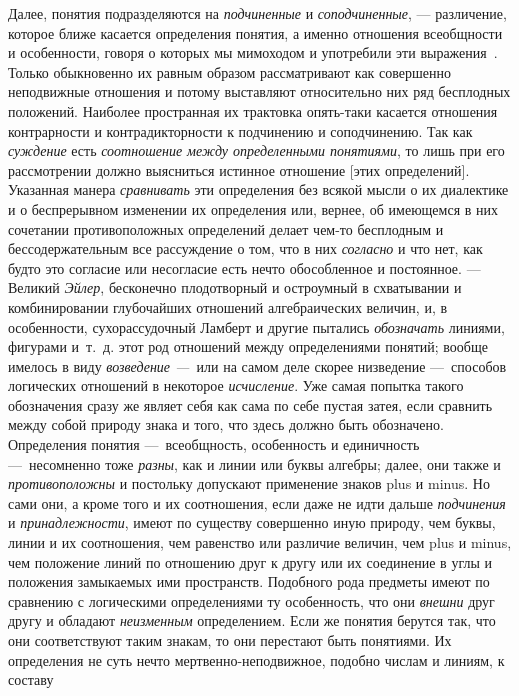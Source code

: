 \documentclass[twoside]{article}
\begin{document}
{{Далее, понятия подразделяются на
{\em подчиненные} и
{\em соподчиненные}, — 
различение, которое ближе касается определения понятия, а
именно отношения всеобщности и особенности, говоря о которых мы мимоходом и
употребили эти
выражения~\label{bkm:bm22}.
Только обыкновенно их равным образом
рассматривают как совершенно неподвижные отношения и потому выставляют
относительно них ряд бесплодных положений. Наиболее пространная их
трактовка опять-таки касается отношения контрарности и контрадикторности к
подчинению и соподчинению. Так как
{\em суждение} есть
{\em соотношение между определенными
понятиями}, то лишь при его рассмотрении должно выясниться
истинное отношение [этих определений]. Указанная манера
{\em сравнивать} эти
определения без всякой мысли о их диалектике и о беспрерывном изменении их
определения или, вернее, об имеющемся в них сочетании противоположных
определений делает чем-то бесплодным и бессодержательным все рассуждение о
том, что в них {\em согласно}
и что нет, как будто это согласие или несогласие есть нечто
обособленное и постоянное. — Великий
{\em Эйлер}, бесконечно
плодотворный и остроумный в схватывании и комбинировании глубочайших
отношений алгебраических величин, и, в особенности, сухорассудочный Ламберт
и другие пытались {\em обозначать}
линиями, фигурами и~т.~д. этот род отношений между
определениями понятий; вообще имелось в виду
{\em возведение —~}или на
самом деле скорее низведение —~способов логических отношений
в некоторое {\em исчисление}.
Уже самая попытка такого обозначения сразу же являет себя как
сама по себе пустая затея, если сравнить между собой природу знака и того,
что здесь должно быть обозначено. Определения понятия
—~всеобщность, особенность и единичность
—~несомненно тоже
{\em разны}, как и линии
или буквы алгебры; далее, они также и
{\em противоположны} и
постольку допускают применение знаков plus и minus.
Но сами они, а кроме того и их соотношения, если даже не идти
дальше {\em подчинения} и
{\em принадлежности},
имеют по существу совершенно иную природу, чем буквы, линии и
их соотношения, чем равенство или различие величин, чем plus
и minus, чем положение линий по отношению друг
к другу или их соединение в углы и положения замыкаемых ими пространств.
Подобного рода предметы имеют по сравнению с логическими определениями ту
особенность, что они {\em внешни}
друг другу и обладают
{\em неизменным}
определением. Если же понятия берутся так, что они
соответствуют таким знакам, то они перестают быть понятиями. Их определения
не суть нечто мертвенно-неподвижное, подобно числам и линиям, к составу
}}
\end{document}
